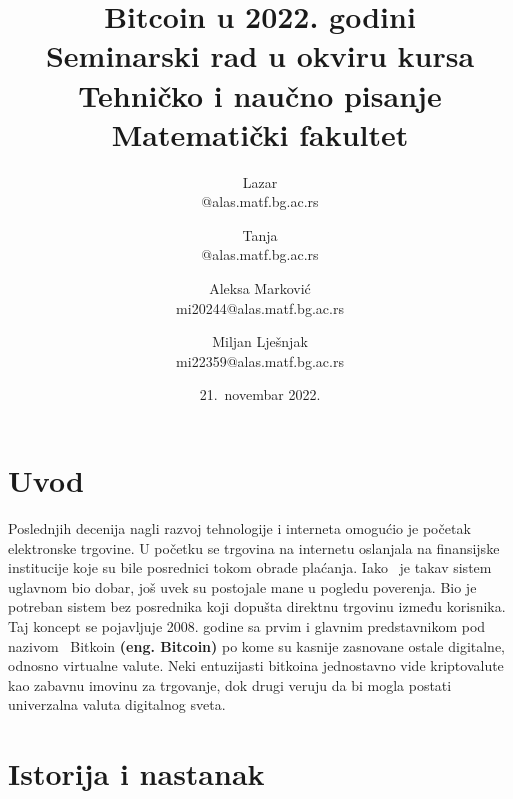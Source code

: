 \documentclass[a4paper]{article}
\begin{document}
\title{Bitcoin u 2022. godini\\ \small{Seminarski rad u okviru kursa\\Tehničko i naučno pisanje\\ Matematički fakultet}}

\author{Lazar\\ @alas.matf.bg.ac.rs\and Tanja\\@alas.matf.bg.ac.rs\and Aleksa Marković\\mi20244@alas.matf.bg.ac.rs\and Miljan Lješnjak\\mi22359@alas.matf.bg.ac.rs }
\date{21.~novembar 2022.}
\maketitle


\tableofcontents


\newpage

\section{Uvod}
\label{sec:uvod}
Poslednjih decenija nagli razvoj tehnologije i interneta omogućio je početak elektronske trgovine. U početku se trgovina na internetu oslanjala na finansijske institucije koje su bile posrednici tokom obrade plaćanja. Iako  je takav sistem uglavnom bio dobar, još uvek su postojale mane u pogledu poverenja. Bio je potreban sistem bez posrednika koji dopušta direktnu trgovinu između korisnika. Taj koncept se pojavljuje 2008. godine sa prvim i glavnim predstavnikom pod nazivom  Bitkoin \textbf{(eng. Bitcoin)} po kome su kasnije zasnovane ostale digitalne, odnosno virtualne valute. Neki entuzijasti bitkoina jednostavno vide kriptovalute kao zabavnu imovinu za trgovanje, dok drugi veruju da bi mogla postati univerzalna valuta digitalnog sveta.
\\

\section{Istorija i nastanak}
\end{document}
